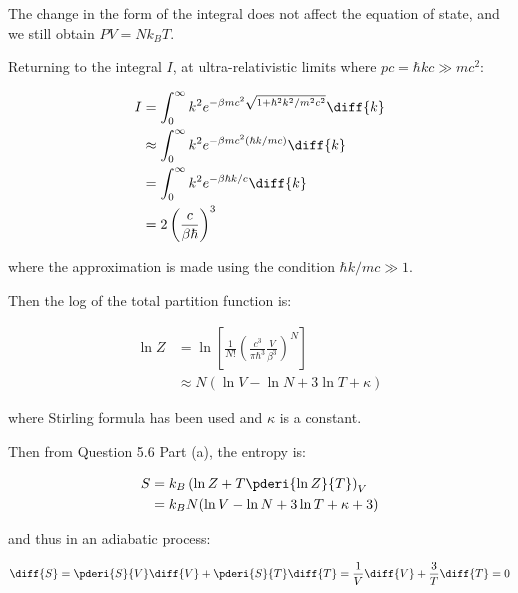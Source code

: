 \documentclass[12pt]{article}
\begin{document}
The change in the form of the integral does not affect the equation of state, and we still obtain $PV = Nk_{B}T$.

Returning to the integral $I$, at ultra-relativistic limits where $pc = \hbar k c \gg mc^{2}$:

\begin{equation}
    \begin{split}
        I &= \int_{0}^{\infty} k^{2} e^{-\beta m c^{2} \sqrt{1 + \hbar^{2}k^{2}/m^{2}c^{2}}} \diff{k} \\
        &\approx \int_{0}^{\infty} k^{2} e^{-\beta m c^{2}  (\hbar k/mc)} \diff{k} \\
        &=\int_{0}^{\infty} k^{2} e^{-\beta \hbar k/c} \diff{k} \\
        &= 2 \left( \frac{c}{\beta \hbar} \right)^3
    \end{split}
\end{equation}

where the approximation is made using the condition $\hbar k/mc \gg 1$.

Then the log of the total partition function is:

\begin{equation}
    \begin{split}
        \ln{Z} &= \ln{\left[ \frac{1}{N!} \left( \frac{c^3}{\pi \hbar^{3}} \frac{V}{\beta^3} \right)^{N} \right]} \\
        &\approx N (\ln{V} - \ln{N} + 3\ln{T} + \kappa)
    \end{split}
\end{equation}

where Stirling formula has been used and $\kappa$ is a constant.

Then from Question 5.6 Part (a), the entropy is:

\begin{equation}
    \begin{split}
        S &= k_{B} \left( \ln{Z} + T \pderi{\ln{Z}}{T} \right)_{V} \\
        &= k_{B} N (\ln{V} - \ln{N} + 3\ln{T} + \kappa + 3)
    \end{split}
\end{equation}

and thus in an adiabatic process:

\begin{equation}
    \diff{S} = \pderi{S}{V} \diff{V} + \pderi{S}{T} \diff{T} = \frac{1}{V} \diff{V} + \frac{3}{T} \diff{T} = 0
\end{equation}
\end{document}
